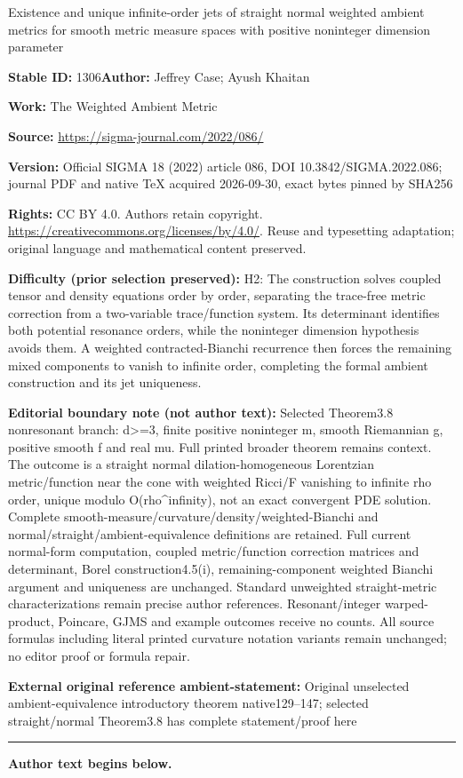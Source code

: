 \documentclass[11pt]{article}
\numberwithin{equation}{section}
\numberwithin{equation}{section}
\begin{document}
\begin{center}\Large Existence and unique infinite-order jets of straight normal weighted ambient metrics for smooth metric measure spaces with positive noninteger dimension parameter\end{center}
\noindent\textbf{Stable ID:} 1306\quad\textbf{Author:} Jeffrey Case; Ayush Khaitan\par
\noindent\textbf{Work:} The Weighted Ambient Metric\par
\noindent\textbf{Source:} \url{https://sigma-journal.com/2022/086/}\par
\noindent\textbf{Version:} Official SIGMA 18 (2022) article 086, DOI 10.3842/SIGMA.2022.086; journal PDF and native TeX acquired 2026-09-30, exact bytes pinned by SHA256\par
\noindent\textbf{Rights:} CC BY 4.0. Authors retain copyright. \url{https://creativecommons.org/licenses/by/4.0/}. Reuse and typesetting adaptation; original language and mathematical content preserved.\par
\noindent\textbf{Difficulty (prior selection preserved):} {\CJKfont H2: The construction solves coupled tensor and density equations order by order, separating the trace-free metric correction from a two-variable trace/function system. Its determinant identifies both potential resonance orders, while the noninteger dimension hypothesis avoids them. A weighted contracted-Bianchi recurrence then forces the remaining mixed components to vanish to infinite order, completing the formal ambient construction and its jet uniqueness.}\par
\medskip\noindent\textbf{Editorial boundary note (not author text):} Selected Theorem3.8 nonresonant branch: d>=3, finite positive noninteger m, smooth Riemannian g, positive smooth f and real mu. Full printed broader theorem remains context. The outcome is a straight normal dilation-homogeneous Lorentzian metric/function near the cone with weighted Ricci/F vanishing to infinite rho order, unique modulo O(rho\textasciicircum{}infinity), not an exact convergent PDE solution. Complete smooth-measure/curvature/density/weighted-Bianchi and normal/straight/ambient-equivalence definitions are retained. Full current normal-form computation, coupled metric/function correction matrices and determinant, Borel construction4.5(i), remaining-component weighted Bianchi argument and uniqueness are unchanged. Standard unweighted straight-metric characterizations remain precise author references. Resonant/integer warped-product, Poincare, GJMS and example outcomes receive no counts. All source formulas including literal printed curvature notation variants remain unchanged; no editor proof or formula repair.\par
\noindent\textbf{External original reference ambient-statement:} Original unselected ambient-equivalence introductory theorem native129–147; selected straight/normal Theorem3.8 has complete statement/proof here\par
\medskip\hrule\medskip\noindent\textbf{Author text begins below.}\par
\end{document}
